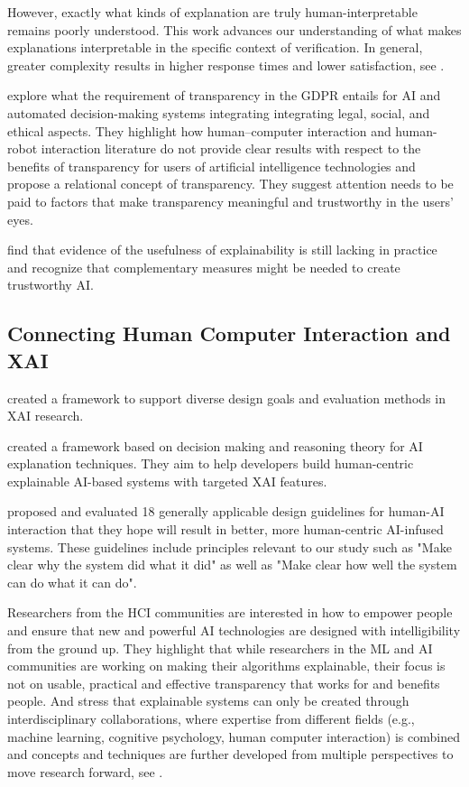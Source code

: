 \documentclass[manuscript,screen,review]{acmart}
\begin{document}
However, exactly what kinds of explanation are truly human-interpretable remains poorly understood.
This work advances our understanding of what makes explanations interpretable in the specific context of verification.
In general, greater complexity results in higher response times and lower satisfaction, see \cite{Narayanan2018}.

\cite{Felzmann2019} explore what the requirement of transparency in the GDPR entails for AI and automated decision-making systems integrating integrating legal, social, and ethical aspects.
They highlight how human–computer interaction and human-robot interaction literature do not provide clear results with respect to the benefits of transparency for users of artificial intelligence technologies
and propose a relational concept of transparency. 
They suggest attention needs to be paid to factors that make transparency meaningful and trustworthy in the users’ eyes.

\cite{Markus2021} find that evidence of the usefulness of explainability is still lacking in practice and recognize that complementary measures might be needed to create trustworthy AI.


\subsection{Connecting Human Computer Interaction and XAI}\label{subsec:human-computer-interaction-focused-xai}

\cite{Mohseni2021} created a framework to support diverse design goals and evaluation methods in XAI research.

\cite{Wang2019} created a framework based on decision making and reasoning theory for AI explanation techniques.
They aim to help developers build human-centric explainable AI-based systems with targeted XAI features.

\cite{Amershi2019} proposed and evaluated 18 generally applicable design guidelines for human-AI interaction that they hope will result in better, more human-centric AI-infused systems. 
These guidelines include principles relevant to our study such as "Make clear why the system did what it did" as well as "Make clear how well the system can do what it can
do".

Researchers from the HCI communities are interested in how to empower people and ensure that new and powerful AI technologies are designed with intelligibility from the ground up.
They highlight that while researchers in the ML and AI communities are working on making their algorithms explainable, their focus is not on usable, practical and effective transparency that works for and benefits people.
And stress that explainable systems can only be created through interdisciplinary collaborations, where expertise from different fields (e.g., machine learning, cognitive psychology, human computer interaction) is combined and concepts and techniques are further developed from multiple perspectives to move research forward, see \cite{Abdul2018}.
\end{document}
